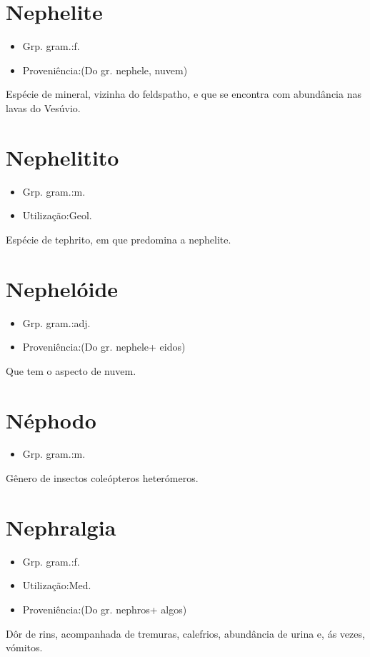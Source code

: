 \section{Nephelite}
\begin{itemize}
\item {Grp. gram.:f.}
\end{itemize}
\begin{itemize}
\item {Proveniência:(Do gr. \textunderscore nephele\textunderscore , nuvem)}
\end{itemize}
Espécie de mineral, vizinha do feldspatho, e que se encontra com abundância nas lavas do Vesúvio.
\section{Nephelitito}
\begin{itemize}
\item {Grp. gram.:m.}
\end{itemize}
\begin{itemize}
\item {Utilização:Geol.}
\end{itemize}
Espécie de tephrito, em que predomina a nephelite.
\section{Nephelóide}
\begin{itemize}
\item {Grp. gram.:adj.}
\end{itemize}
\begin{itemize}
\item {Proveniência:(Do gr. \textunderscore nephele\textunderscore  + \textunderscore eidos\textunderscore )}
\end{itemize}
Que tem o aspecto de nuvem.
\section{Néphodo}
\begin{itemize}
\item {Grp. gram.:m.}
\end{itemize}
Gênero de insectos coleópteros heterómeros.
\section{Nephralgia}
\begin{itemize}
\item {Grp. gram.:f.}
\end{itemize}
\begin{itemize}
\item {Utilização:Med.}
\end{itemize}
\begin{itemize}
\item {Proveniência:(Do gr. \textunderscore nephros\textunderscore  + \textunderscore algos\textunderscore )}
\end{itemize}
Dôr de rins, acompanhada de tremuras, calefrios, abundância de urina e, ás vezes, vómitos.
